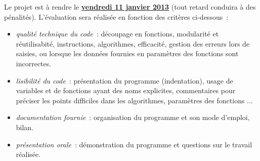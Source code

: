 \documentclass[10pt]{article}
\begin{document}
Le projet est à rendre le \underline{\bf vendredi 11 janvier 2013} 
(tout retard conduira à des pénalités). L'évaluation sera réalisée en fonction 
des critères ci-dessous~:
\begin{itemize}

\item  \textit{qualité technique du code}~: découpage en fonctions, modularité et réutilisabité, instructions, algorithmes, efficacité, gestion des erreurs lors de saisies, ou lorsque les données fournies en paramètres des fonctions sont incorrectes.

\item \textit{lisibilité du code}~: présentation du programme (indentation), usage de variables et de fonctions ayant des noms explicites, commentaires pour préciser les points difficiles dans les algorithmes, paramètres des fonctions $\ldots$ 

\item \textit{documentation fournie}~: organisation du programme et son mode d'emploi, bilan.

\item \textit{présentation orale}~: démonstration du programme et questions sur le travail réalisée.


\end{itemize}
\end{document}
